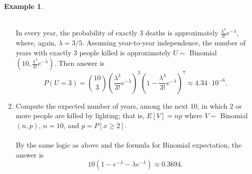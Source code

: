 \documentclass[12pt,a4paper]{article}
\theoremstyle{definition}
\newtheorem{example}{Example}[section]
\theoremstyle{definition}
\theoremstyle{definition}
\theoremstyle{definition}
\theoremstyle{remark}
\theoremstyle{definition}
\begin{document}
\begin{example}
\begin{enumerate}
		\\
		In every year, the probability of exactly $3$ deaths is approximately $\displaystyle\frac{\lambda^3}{3!}e^{-\lambda}$, where, again, $\lambda=3/5$. Assuming year-to-year independence, the number of years with exactly 3 people killed is approximately $U\sim$ Binomial$\left(10,\frac{\lambda^3}{3!}e^{-\lambda}\right)$. Then answer is \[
		P(U=3)=\binom{10}{3}\left(\frac{\lambda^3}{3!}e^{-\lambda}\right)^3\left(1-\frac{\lambda^3}{3!}e^{-\lambda}\right)^7\approx4.34\cdot10^{-6}.
		\]
		\item Compute the expected number of years, among the next 10, in which 2 or more people are killed by lighting; that is, $E[V]=np$ where $V\sim$ Binomial$(n,p)$, $n=10$, and $p=P[x\geq 2]$.\\
		\\
		By the same logic as above and the formula for Binomial expectation, the answer is \[
		10(1-e^{-\lambda}-\lambda e^{-\lambda})\approx0.3694.
		\]
	\end{enumerate}
\end{example}
\
\end{document}
